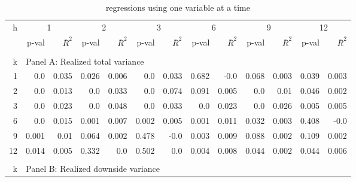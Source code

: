 \begin{small}
\begin{table}[h]
\begin{center}
\caption{regressions using one variable at a time}
\label{table:regression1}

\begin{tabular}{@{\extracolsep{6pt}}rrrrrrrrrrrrr@{}}

\hline

h & \multicolumn{2}{c}{1} & \multicolumn{2}{c}{2} & \multicolumn{2}{c}{3} & \multicolumn{2}{c}{6} & \multicolumn{2}{c}{9} & \multicolumn{2}{c}{12} \\[6pt]

\cline{2-3} \cline{4-5} \cline{6-7} \cline{8-9} \cline{10-11} \cline{12-13}

 & p-val & $\bar{R}^{2}$ & p-val & $\bar{R}^{2}$ &  p-val & $\bar{R}^{2}$ &  
 p-val & $\bar{R}^{2}$ &  p-val & $\bar{R}^{2}$ &  p-val & $\bar{R}^{2}$ \\[6pt]
 
\hline\\[0.000000001pt]

k & \multicolumn{12}{l}{Panel A: Realized total variance} \\[7pt]

\hline

1 & 0.0 & 0.035 & 0.026 & 0.006 & 0.0 & 0.033 & 0.682 & -0.0 & 0.068 & 0.003 & 0.039 & 0.003 \\[6pt]
2 & 0.0 & 0.013 & 0.0 & 0.033 & 0.0 & 0.074 & 0.091 & 0.005 & 0.0 & 0.01 & 0.046 & 0.002 \\[6pt]
3 & 0.0 & 0.023 & 0.0 & 0.048 & 0.0 & 0.033 & 0.0 & 0.023 & 0.0 & 0.026 & 0.005 & 0.005 \\[6pt]
6 & 0.0 & 0.015 & 0.001 & 0.007 & 0.002 & 0.005 & 0.001 & 0.011 & 0.032 & 0.003 & 0.408 & -0.0 \\[6pt]
9 & 0.001 & 0.01 & 0.064 & 0.002 & 0.478 & -0.0 & 0.003 & 0.009 & 0.088 & 0.002 & 0.109 & 0.002 \\[6pt]
12 & 0.014 & 0.005 & 0.332 & 0.0 & 0.502 & 0.0 & 0.004 & 0.008 & 0.044 & 0.002 & 0.044 & 0.006 \\[6pt]
 
\hline\\[0.000000001pt]

k & \multicolumn{12}{l}{Panel B: Realized downside variance} \\[7pt]

\hline


\end{tabular}
\end{center}
\end{table}
\end{small}

